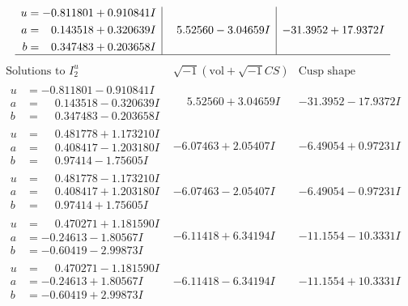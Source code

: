 \documentclass[1p]{elsarticle_modified}
\theoremstyle{definition}
\newcommand{\I}{\sqrt{-1}}
\begin{document}
$$\begin{array}{c|c|c}
\begin{aligned}
u &= -0.811801 + 0.910841 I \\
a &= \phantom{-}0.143518 + 0.320639 I \\
b &= \phantom{-}0.347483 + 0.203658 I\end{aligned}
 & \phantom{-}5.52560 - 3.04659 I & -31.3952 + 17.9372 I\\
 \hline 
 \end{array}$$\newpage$$\begin{array}{c|c|c}  
\text{Solutions to }I^u_{2}& \I (\text{vol} + \sqrt{-1}CS) & \text{Cusp shape}\\
 \hline 
\begin{aligned}
u &= -0.811801 - 0.910841 I \\
a &= \phantom{-}0.143518 - 0.320639 I \\
b &= \phantom{-}0.347483 - 0.203658 I\end{aligned}
 & \phantom{-}5.52560 + 3.04659 I & -31.3952 - 17.9372 I \\ \hline\begin{aligned}
u &= \phantom{-}0.481778 + 1.173210 I \\
a &= \phantom{-}0.408417 - 1.203180 I \\
b &= \phantom{-}0.97414 - 1.75605 I\end{aligned}
 & -6.07463 + 2.05407 I & -6.49054 + 0.97231 I \\ \hline\begin{aligned}
u &= \phantom{-}0.481778 - 1.173210 I \\
a &= \phantom{-}0.408417 + 1.203180 I \\
b &= \phantom{-}0.97414 + 1.75605 I\end{aligned}
 & -6.07463 - 2.05407 I & -6.49054 - 0.97231 I \\ \hline\begin{aligned}
u &= \phantom{-}0.470271 + 1.181590 I \\
a &= -0.24613 - 1.80567 I \\
b &= -0.60419 - 2.99873 I\end{aligned}
 & -6.11418 + 6.34194 I & -11.1554 - 10.3331 I \\ \hline\begin{aligned}
u &= \phantom{-}0.470271 - 1.181590 I \\
a &= -0.24613 + 1.80567 I \\
b &= -0.60419 + 2.99873 I\end{aligned}
 & -6.11418 - 6.34194 I & -11.1554 + 10.3331 I \\ \hline\begin{aligned}

\end{aligned}
\end{array}$$
\end{document}
